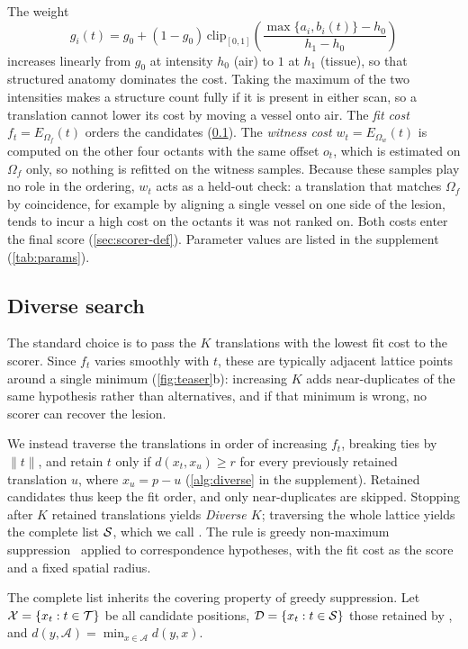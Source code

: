 The weight
\begin{equation}
g_i(t) = g_0 + (1-g_0)\,\mathrm{clip}_{[0,1]}\!\left(\frac{\max\{a_i, b_i(t)\} - h_0}{h_1 - h_0}\right)
\end{equation}
increases linearly from $g_0$ at intensity $h_0$ (air) to $1$ at $h_1$ (tissue), so that structured anatomy dominates the cost.
Taking the maximum of the two intensities makes a structure count fully if it is present in either scan, so a translation cannot lower its cost by moving a vessel onto air. The \emph{fit cost} $f_t = E_{\Omega_f}(t)$ orders the candidates (\cref{sec:diverse}).
The \emph{witness cost} $w_t = E_{\Omega_w}(t)$ is computed on the other four octants with the same offset $o_t$, which is estimated on $\Omega_f$ only, so nothing is refitted on the witness samples.
Because these samples play no role in the ordering, $w_t$ acts as a held-out check: a translation that matches $\Omega_f$ by coincidence, for example by aligning a single vessel on one side of the lesion, tends to incur a high cost on the octants it was not ranked on.
Both costs enter the final score (\cref{sec:scorer-def}). Parameter values are listed in the supplement (\cref{tab:params}).
\subsection{Diverse search}
\label{sec:diverse}
The standard choice is to pass the $K$ translations with the lowest fit cost to the scorer.
Since $f_t$ varies smoothly with $t$, these are typically adjacent lattice points around a single minimum (\cref{fig:teaser}b): increasing $K$ adds near-duplicates of the same hypothesis rather than alternatives, and if that minimum is wrong, no scorer can recover the lesion.

We instead traverse the translations in order of increasing $f_t$, breaking ties by $\|t\|$, and retain $t$ only if $d(x_t, x_u) \ge r$ for every previously retained translation $u$, where $x_u = p - u$ (\cref{alg:diverse} in the supplement).
Retained candidates thus keep the fit order, and only near-duplicates are skipped.
Stopping after $K$ retained translations yields \emph{Diverse $K$}; traversing the whole lattice yields the complete list $\mathcal{S}$, which we call \emph{\ours}.
The rule is greedy non-maximum suppression~\cite{neubeck2006nms} applied to correspondence hypotheses, with the fit cost as the score and a fixed spatial radius.

The complete list inherits the covering property of greedy suppression.
Let $\mathcal{X} = \{x_t : t \in \mathcal{T}\}$ be all candidate positions, $\mathcal{D} = \{x_t : t \in \mathcal{S}\}$ those retained by \ours, and $d(y, \mathcal{A}) = \min_{x \in \mathcal{A}} d(y, x)$.

